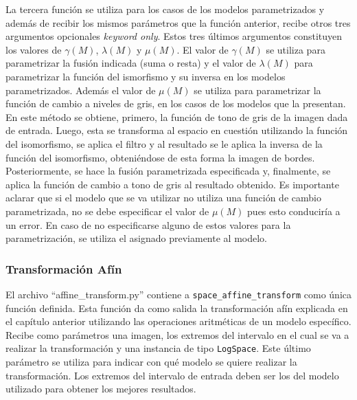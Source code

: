 La tercera funci\'on se utiliza para los casos de los modelos parametrizados y adem\'as de recibir los mismos par\'ametros que la funci\'on anterior, recibe otros tres argumentos opcionales \textit{keyword only}. Estos tres \'ultimos argumentos constituyen los valores de $\gamma(M)$, $\lambda(M)$ y $\mu(M)$. El valor de $\gamma(M)$ se utiliza para parametrizar la fusi\'on indicada (suma o resta) y el valor de $\lambda(M)$ para parametrizar la funci\'on del ismorfismo y su inversa en los modelos parametrizados. Adem\'as el valor de $\mu(M)$ se utiliza para parametrizar la funci\'on de cambio a niveles de gris, en los casos de los modelos que la presentan. En este m\'etodo se obtiene, primero, la funci\'on de tono de gris de la imagen dada de entrada. Luego, esta se transforma al espacio en cuesti\'on utilizando la funci\'on del isomorfismo, se aplica el filtro y al resultado se le aplica la inversa de la funci\'on del isomorfismo, obteni\'endose de esta forma la imagen de bordes. Posteriormente, se hace la fusi\'on parametrizada especificada y, finalmente, se aplica la funci\'on de cambio a tono de gris al resultado obtenido. Es importante aclarar que si el modelo que se va utilizar no utiliza una funci\'on de cambio parametrizada, no se debe especificar el valor de $\mu(M)$ pues esto conducir\'ia a un error. En caso de no especificarse alguno de estos valores para la parametrizaci\'on, se utiliza el asignado previamente al modelo.

\subsubsection{Transformaci\'on Af\'in}

El archivo ``affine\_transform.py'' contiene a \verb|space_affine_transform| como \'unica funci\'on definida. Esta funci\'on da como salida la transformaci\'on af\'in explicada en el cap\'itulo anterior utilizando las operaciones aritm\'eticas de un modelo espec\'ifico. Recibe como par\'ametros una imagen, los extremos del intervalo en el cual se va a realizar la transformaci\'on y una instancia de tipo \verb|LogSpace|. Este \'ultimo par\'ametro se utiliza para indicar con qu\'e modelo se quiere realizar la transformaci\'on. Los extremos del intervalo de entrada deben ser los del modelo utilizado para obtener los mejores resultados.

